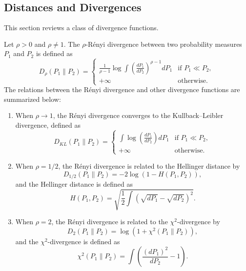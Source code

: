 \documentclass[twoside,11pt]{article}
\numberwithin{equation}{section}
\begin{document}
{\subsection{Distances and Divergences}\label{subsect:divergence}
This section reviews a class of divergence functions. 
\begin{definition}
Let $\rho > 0$ and $\rho \neq 1$. The $\rho$-Rényi divergence between two probability measures $P_1$ and $P_2$ is defined as
\begin{equation*}
D_\rho(P_1 \parallel P_2) =
\begin{cases}
\frac{1}{\rho - 1} \log \int \left(\frac{dP_1}{dP_2}\right)^{\rho -1} dP_1 & \text{if } P_1 \ll P_2, \\
+\infty & \text{otherwise.}
\end{cases}
\end{equation*}
The relations between the Rényi divergence and other divergence functions are summarized below:
\begin{enumerate}
\item When $\rho \to 1$, the Rényi divergence converges to the Kullback--Leibler divergence, defined as
\begin{equation*}
D_{KL}(P_1 \parallel P_2) =
\begin{cases}
\int \log \left(\frac{dP_1}{dP_2}\right) dP_1 & \text{if } P_1 \ll P_2, \\
+\infty & \text{otherwise.}
\end{cases}
\end{equation*}
\item When $\rho = 1/2$, the Rényi divergence is related to the Hellinger distance by
\begin{equation*}
D_{1/2}(P_1 \parallel P_2) = -2 \log \left(1 - H(P_1,P_2)\right),
\end{equation*}
and the Hellinger distance is defined as
\begin{equation*}
H(P_1,P_2) = \sqrt{\frac{1}{2} \int \left(\sqrt{dP_1} - \sqrt{dP_2}\right)^2}.
\end{equation*}
\item When $\rho = 2$, the Rényi divergence is related to the $\chi^2$-divergence by
\begin{equation*}
D_2(P_1 \parallel P_2) = \log \left(1 + \chi^2(P_1 \parallel P_2)\right),
\end{equation*}
and the $\chi^2$-divergence is defined as
\begin{equation*}
\chi^2(P_1 \parallel P_2) = \int \left(\frac{(dP_1)^2}{dP_2} - 1\right).
\end{equation*}
\end{enumerate}
\end{definition}

}
\end{document}
